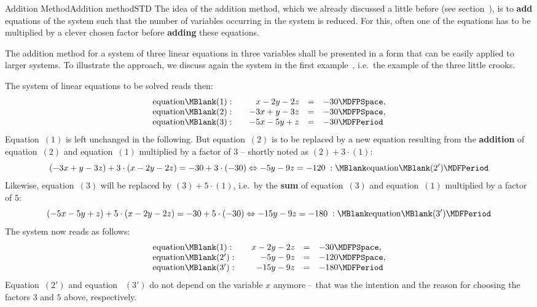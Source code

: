\begin{MXContent}{Addition Method}{Addition method}{STD}
The idea of the addition method, which we already discussed a little before (see
section~), is to \textbf{add} equations of the system such that
the number of variables occurring in the system is reduced. For this, often one 
of the equations has to be multiplied by a clever chosen factor before 
\textbf{adding} these equations.

The addition method for a system of three linear equations in three variables 
shall be presented in a form that can be easily applied to larger systems. 
To illustrate the approach, we discuss again the system in the first
example~, i.e.\ the example of the 
three little crooks.

\begin{MExample}
The system of linear equations to be solved reads then:
$$\begin{array}{lcrcl} \mbox{equation}\MBlank (1): & & x - 2 y - 2 z & = & - 30 \MDFPSpace, \\
\mbox{equation}\MBlank (2): & & - 3 x + y - 3 z & = & - 30 \MDFPSpace, \\
\mbox{equation}\MBlank (3): & & - 5 x - 5 y + z & = & - 30 \MDFPeriod \end{array}$$
Equation~$(1)$ is left unchanged in the following. 
But equation~$(2)$ is to be replaced by a new equation resulting from the 
\textbf{addition} of equation~$(2)$ and equation~$(1)$ multiplied by a factor of 
$3$ -- shortly noted as $(2) + 3 \cdot (1)$:
$$(-3 x + y - 3 z) + 3 \cdot (x - 2 y - 2 z) = - 30 + 3 \cdot (- 30) \Leftrightarrow
- 5 y - 9 z = - 120 \; : \MBlank\mbox{equation}\MBlank (2') \MDFPeriod $$
Likewise, equation~$(3)$ will be replaced by $(3) + 5 \cdot (1)$, i.e.\
by the \textbf{sum} of equation~$(3)$ and equation~$(1)$ multiplied by a factor of $5$:
$$(- 5 x - 5 y + z) + 5 \cdot (x - 2 y - 2 z) = - 30 + 5 \cdot (- 30) \Leftrightarrow
-15 y - 9 z = - 180 \; : \MBlank\mbox{equation}\MBlank (3') \MDFPeriod $$
The system now reads as follows:
$$\begin{array}{lcrcl} \mbox{equation}\MBlank (1): & & x - 2 y - 2 z & = & - 30 \MDFPSpace, \\
\mbox{equation}\MBlank (2'): & & - 5 y - 9 z & = & - 120 \MDFPSpace, \\
\mbox{equation}\MBlank (3'): & & - 15 y - 9 z & = & - 180  \MDFPeriod \end{array}$$
Equation~$(2')$ and equation~ $(3')$ do not depend on the variable $x$ anymore --
that was the intention and the reason for choosing the factors $3$ and $5$ above, respectively.


\end{MExample}
\end{MXContent}
